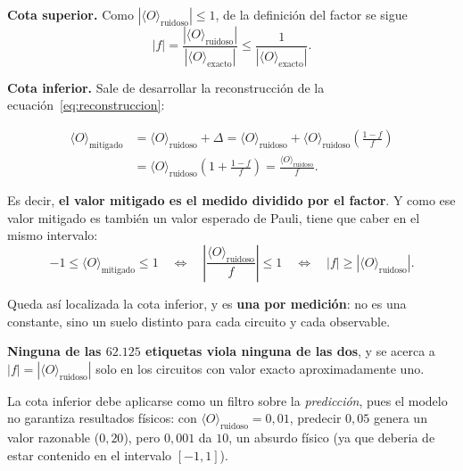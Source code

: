 \textbf{Cota superior.} Como $|\langle O\rangle_{\text{ruidoso}}| \le 1$, de la definición del factor se sigue
\begin{equation}
\label{eq:cota_superior}
|f| = \frac{|\langle O\rangle_{\text{ruidoso}}|}{|\langle O\rangle_{\text{exacto}}|} \le \frac{1}{|\langle O\rangle_{\text{exacto}}|} .
\end{equation}

\textbf{Cota inferior.} Sale de desarrollar la reconstrucción de la
ecuación~\eqref{eq:reconstruccion}:

\begin{equation}
\label{eq:mitigado_desarrollo}
\begin{split}
\langle O\rangle_{\text{mitigado}} &= \langle O\rangle_{\text{ruidoso}} + \Delta = \langle O\rangle_{\text{ruidoso}} + \langle O\rangle_{\text{ruidoso}} \left(\frac{1-f}{f}\right) \\
&= \langle O\rangle_{\text{ruidoso}} \left(1 + \frac{1-f}{f}\right) = \frac{\langle O\rangle_{\text{ruidoso}}}{f} .
\end{split}
\end{equation}

\noindent Es decir, \textbf{el valor mitigado es el medido dividido por el factor}. Y como ese
valor mitigado es también un valor esperado de Pauli, tiene que caber en el mismo intervalo:
\begin{equation}
\label{eq:cota_inferior}
-1 \le \langle O\rangle_{\text{mitigado}} \le 1
\quad \Longleftrightarrow \quad \left|\frac{\langle O\rangle_{\text{ruidoso}}}{f}\right| \le 1
\quad \Longleftrightarrow \quad |f| \ge |\langle O\rangle_{\text{ruidoso}}| .
\end{equation}

\noindent Queda así localizada la cota inferior, y es \textbf{una por medición}: no es una
constante, sino un suelo distinto para cada circuito y cada observable.

\noindent \textbf{Ninguna de las $62{.}125$ etiquetas viola ninguna de las dos}, y se acerca a $|f| = |\langle O\rangle_{\text{ruidoso}}|$ solo en los circuitos con valor exacto aproximadamente uno. 

La cota inferior debe aplicarse como un filtro sobre la \emph{predicción}, pues el modelo no garantiza resultados físicos: con $\langle O\rangle_{\text{ruidoso}} = 0{,}01$, predecir $0{,}05$ genera un valor razonable ($0{,}20$), pero $0{,}001$ da $10$, un absurdo físico (ya que deberia de estar contenido en el intervalo $[-1,1]$).

